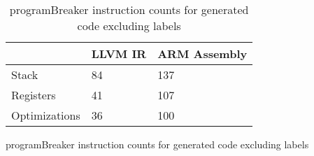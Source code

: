 \begin{table}[h!]
\centering
\begin{tabular}{p{}p{}p{}}
  \hline
 & LLVM IR & ARM Assembly \\ 
  \hline
Stack &  84 & 137 \\ 
  Registers &  41 & 107 \\ 
  Optimizations &  36 & 100 \\ 
   \hline
\end{tabular}
\caption{programBreaker instruction counts for generated code excluding labels}
\caption{programBreaker instruction counts for generated code excluding labels}
\end{table}
